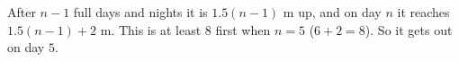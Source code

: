 After $n-1$ full days and nights it is $1.5(n-1)$ m up, and on day $n$ it reaches $1.5(n-1)+2$ m. This is at least $8$ first when $n=5$ ($6+2=8$). So it gets out on day $\boxed{5}$.
